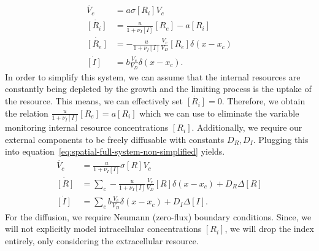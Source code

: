 \documentclass[10pt,A4paper]{article}
\numberwithin{equation}{section}
\begin{document}
\begin{align}
    \dot{V_c} &= a\sigma [R_i] V_c\\
    \dot{[R_i]} &= \frac{u}{1+\nu_I [I]} [R_e] - a[R_i]\\
    \dot{[R_e]} &= -\frac{u}{1+\nu_I [I]} \frac{V_c}{V_D} [R_e] \delta(x-x_c)\\
    \dot{[I]} &= b\frac{V_c}{V_D}\delta(x-x_c).
    \label{eq:spatial-full-system-non-simplified}
\end{align}
In order to simplify this system, we can assume that the internal resources are constantly being depleted by the growth and the limiting process is the uptake of the resource.
This means, we can effectively set $\dot{[R_i]}=0$.
Therefore, we obtain the relation $\frac{u}{1+\nu_I [I]}[R_e] = a[R_i]$ which we can use to eliminate the variable monitoring internal resource concentrations $[R_i]$.
Additionally, we require our external components to be freely diffusable with constants $D_R,D_I$.
Plugging this into equation~\eqref{eq:spatial-full-system-non-simplified} yields.
\begin{align}
    \dot{V_c} &= \frac{u}{1+\nu_I [I]} \sigma [R]V_c\\
    \dot{[R]} &= \sum\limits_c -\frac{u}{1+\nu_I [I]} \frac{V_c}{V_D} [R] \delta(x-x_c) + D_R\Delta [R]\\
    \dot{[I]} &= \sum\limits_c b\frac{V_c}{V_D}\delta(x-x_c) + D_I\Delta [I].
    \label{eq:spatial-full-system-simplified}
\end{align}
For the diffusion, we require Neumann (zero-flux) boundary conditions.
Since, we will not explicitly model intracellular concentrations $[R_i]$, we will drop the index entirely, only considering the extracellular resource.
%
%
\end{document}
